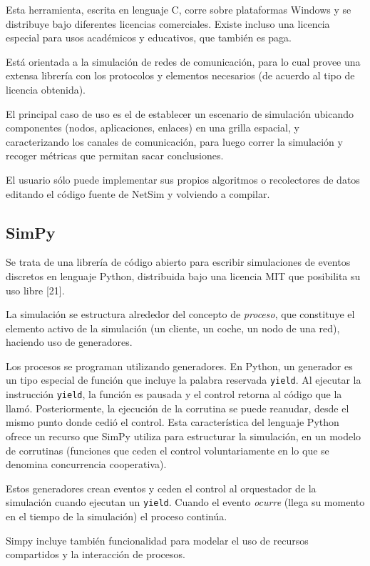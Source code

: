 Esta herramienta, escrita en lenguaje C, corre sobre plataformas Windows y se
distribuye bajo diferentes licencias comerciales. Existe incluso una licencia
especial para usos académicos y educativos, que también es paga.

Está orientada a la simulación de redes de comunicación, para lo cual provee
una extensa librería con los protocolos y elementos necesarios (de acuerdo al
tipo de licencia obtenida).

El principal caso de uso es el de establecer un escenario de simulación
ubicando componentes (nodos, aplicaciones, enlaces) en una grilla espacial, y
caracterizando los canales de comunicación, para luego correr la simulación y
recoger métricas que permitan sacar conclusiones.

El usuario sólo puede implementar sus propios algoritmos o recolectores de
datos editando el código fuente de NetSim y volviendo a compilar.

\subsection{SimPy}

Se trata de una librería de código abierto para escribir simulaciones de
eventos discretos en lenguaje Python, distribuida bajo una licencia MIT que
posibilita su uso libre [21].

La simulación se estructura alrededor del concepto de \textit{proceso}, que
constituye el elemento activo de la simulación (un cliente, un coche, un nodo
de una red), haciendo uso de generadores.

Los procesos se programan utilizando generadores.  En Python, un generador es
un tipo especial de función que incluye la palabra reservada \verb!yield!. Al
ejecutar la instrucción \verb!yield!, la función es pausada y el control
retorna al código que la llamó. Posteriormente, la ejecución de la corrutina se
puede reanudar, desde el mismo punto donde cedió el control. Esta
característica del lenguaje Python ofrece un recurso que SimPy utiliza para
estructurar la simulación, en un modelo de corrutinas (funciones que ceden el
control voluntariamente en lo que se denomina concurrencia cooperativa).

Estos generadores crean eventos y ceden el control al orquestador de la
simulación cuando ejecutan un \verb!yield!. Cuando el evento \textit{ocurre}
(llega su momento en el tiempo de la simulación) el proceso continúa.

Simpy incluye también funcionalidad para modelar el uso de recursos
compartidos y la interacción de procesos.

